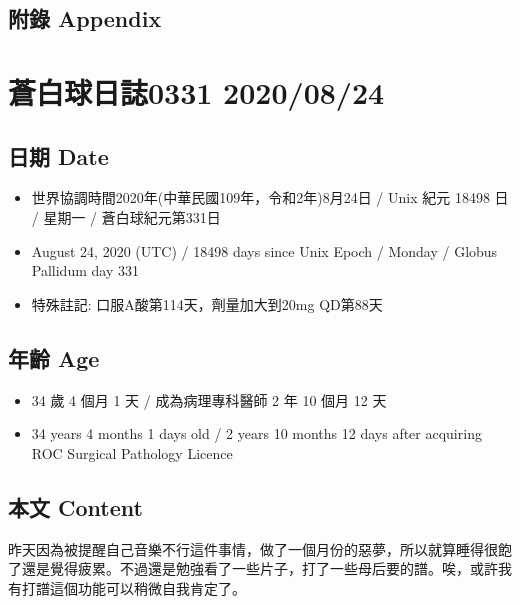 \documentclass[a5paper, 11pt
]{book}
\providecommand{\tightlist}{%
  \setlength{\itemsep}{0pt}\setlength{\parskip}{0pt}}
\begin{document}
\hypertarget{ux9644ux9304-appendix-71}{%
\subsection{附錄 Appendix}\label{ux9644ux9304-appendix-71}}

\hypertarget{ux84bcux767dux7403ux65e5ux8a8c0331-20200824}{%
\section{蒼白球日誌0331
2020/08/24}\label{ux84bcux767dux7403ux65e5ux8a8c0331-20200824}}

\hypertarget{ux65e5ux671f-date-72}{%
\subsection{日期 Date}\label{ux65e5ux671f-date-72}}

\begin{itemize}
\tightlist
\item
  世界協調時間2020年(中華民國109年，令和2年)8月24日 / Unix 紀元 18498 日
  / 星期一 / 蒼白球紀元第331日
\item
  August 24, 2020 (UTC) / 18498 days since Unix Epoch / Monday / Globus
  Pallidum day 331
\item
  特殊註記: 口服A酸第114天，劑量加大到20mg QD第88天
\end{itemize}

\hypertarget{ux5e74ux9f61-age-72}{%
\subsection{年齡 Age}\label{ux5e74ux9f61-age-72}}

\begin{itemize}
\tightlist
\item
  34 歲 4 個月 1 天 / 成為病理專科醫師 2 年 10 個月 12 天
\item
  34 years 4 months 1 days old / 2 years 10 months 12 days after
  acquiring ROC Surgical Pathology Licence
\end{itemize}

\hypertarget{ux672cux6587-content-72}{%
\subsection{本文 Content}\label{ux672cux6587-content-72}}

昨天因為被提醒自己音樂不行這件事情，做了一個月份的惡夢，所以就算睡得很飽了還是覺得疲累。不過還是勉強看了一些片子，打了一些母后要的譜。唉，或許我有打譜這個功能可以稍微自我肯定了。
\end{document}
